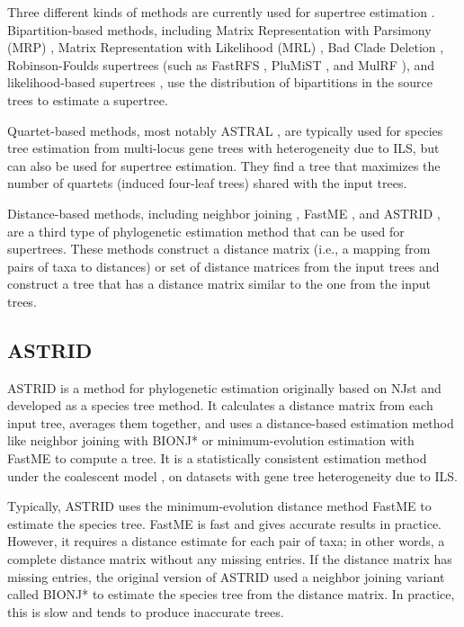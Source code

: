 Three different kinds of methods are currently used for supertree estimation \cite{warnow2018supertree}. Bipartition-based methods, including Matrix Representation with Parsimony (MRP) \cite{ragan1992phylogenetic}, Matrix Representation with Likelihood (MRL) \cite{mrl}, Bad Clade Deletion \cite{fleischauer2017bad}, Robinson-Foulds supertrees \cite{bansal2010robinson} (such as FastRFS \cite{fastrfs}, PluMiST \cite{plumist}, and MulRF \cite{mulrf}), and likelihood-based supertrees \cite{steel2008maximum}, use the distribution of bipartitions in the source trees to estimate a supertree. 

Quartet-based methods, most notably ASTRAL \cite{ASTRAL,ASTRAL-II,ASTRAL-III,ASTRAL-MP}, are typically used for species tree estimation from multi-locus gene trees with heterogeneity due to ILS, but can also be used for supertree estimation. They find a tree that maximizes the number of quartets (induced four-leaf trees) shared with the input trees. 

Distance-based methods, including neighbor joining \cite{saitou1987neighbor}, FastME \cite{lefort2015fastme}, and ASTRID \cite{vachaspati2015astrid}, are a third type of phylogenetic estimation method that can be used for supertrees. These methods construct a distance matrix (i.e., a mapping from pairs of taxa to distances) or set of distance matrices from the input trees and construct a tree that has a distance matrix similar to the one from the input trees.

\subsection{ASTRID}

ASTRID \cite{vachaspati2015astrid} is a method for phylogenetic estimation originally based on NJst \cite{liu2011estimating} and developed as a species tree method. It calculates a distance matrix from each input tree, averages them together, and uses a distance-based estimation method like neighbor joining with BIONJ* \cite{phydstar} or minimum-evolution estimation with FastME \cite{lefort2015fastme} to compute a tree. It is a statistically consistent estimation method under the coalescent model \cite{maddison1997gene}, on datasets with gene tree heterogeneity due to ILS.

Typically, ASTRID uses the minimum-evolution distance method FastME to estimate the species tree. FastME is fast and gives accurate results in practice. However, it requires a distance estimate for each pair of taxa; in other words, a complete distance matrix without any missing entries. If the distance matrix has missing entries, the original version of ASTRID used a neighbor joining variant called BIONJ* to estimate the species tree from the distance matrix. In practice, this is slow and tends to produce inaccurate trees. 

